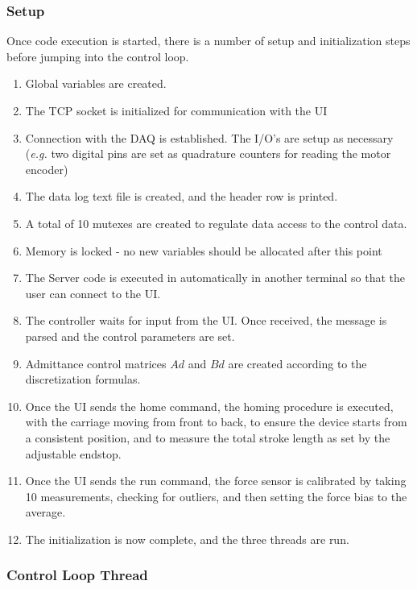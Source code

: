\documentclass[12pt]{report}
\begin{document}
	\subsubsection{Setup}
	
	Once code execution is started, there is a number of setup and initialization steps before jumping into the control loop. 
	
	\begin{enumerate}
		\item Global variables are created. 		
		\item The TCP socket is initialized for communication with the UI
		\item Connection with the DAQ is established. The I/O's are setup as necessary (\textit{e.g.} two digital pins are set as quadrature counters for reading the motor encoder)
		\item The data log text file is created, and the header row is printed. 
		\item A total of 10 mutexes are created to regulate data access to the control data.
		\item Memory is locked - no new variables should be allocated after this point
		\item The Server code is executed in automatically in another terminal so that the user can connect to the UI.
		\item The controller waits for input from the UI. Once received, the message is parsed and the control parameters are set. 
		\item Admittance control matrices $Ad$ and $Bd$ are created according to the discretization formulas.
		\item Once the UI sends the home command, the homing procedure is executed, with the carriage moving from front to back, to ensure the device starts from a consistent position, and to measure the total stroke length as set by the adjustable endstop. 
		\item Once the UI sends the run command, the force sensor is calibrated by taking 10 measurements, checking for outliers, and then setting the force bias to the average. 
		\item The initialization is now complete, and the three threads are run.
	\end{enumerate}
	
	
	\subsubsection{Control Loop Thread}
	
\end{document}
